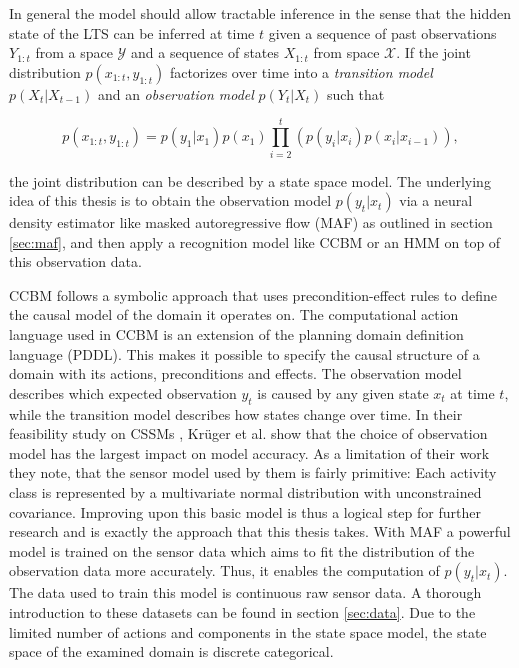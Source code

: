 \documentclass[11pt,titlepage,oneside,openany]{book}
\begin{document}
In general the model should allow tractable inference in the sense that the hidden state of the LTS can be inferred at time $t$ given a sequence of past observations $Y_{1:t}$ from a space $\mathcal{Y}$ and a sequence of states $X_{1:t}$ from space $\mathcal{X}$. If the joint distribution $p(x_{1:t}, y_{1:t})$ factorizes over time into a \emph{transition model} $p(X_t|X_{t-1})$ and an \emph{observation model} $p(Y_t|X_t)$ such that

\begin{equation}
	\label{func:ssm}
	p(x_{1:t}, y_{1:t}) = p(y_1|x_1)p(x_1) \prod_{i=2}^{t} (p(y_i|x_i)p(x_i|x_{i-1})),
\end{equation}

\noindent the joint distribution can be described by a state space model. The underlying idea of this thesis is to obtain the observation model $p(y_t|x_t)$ via a neural density estimator like masked autoregressive flow (MAF) as outlined in section \ref{sec:maf}, and then apply a recognition model like CCBM or an HMM on top of this observation data.   

CCBM follows a symbolic approach that uses precondition-effect rules to define the causal model of the domain it operates on. The computational action language used in CCBM is an extension of the planning domain definition language (PDDL). This makes it possible to specify the causal structure of a domain with its actions, preconditions and effects. The observation model describes which expected observation $y_t$ is caused by any given state $x_t$ at time $t$, while the transition model describes how states change over time. In their feasibility study on CSSMs \cite{kruger_computational_2014}, Kr\"uger et al. show that the choice of observation model has the largest impact on model accuracy. As a limitation of their work they note, that the sensor model used by them is fairly primitive: Each activity class is represented by a multivariate normal distribution with unconstrained covariance. Improving upon this basic model is thus a logical step for further research and is exactly the approach that this thesis takes. With MAF a powerful model is trained on the sensor data which aims to fit the distribution of the observation data more accurately. Thus, it enables the computation of $p(y_t|x_t)$. The data used to train this model is continuous raw sensor data. A thorough introduction to these datasets can be found in section \ref{sec:data}. Due to the limited number of actions and components in the state space model, the state space of the examined domain is discrete categorical.
\end{document}

